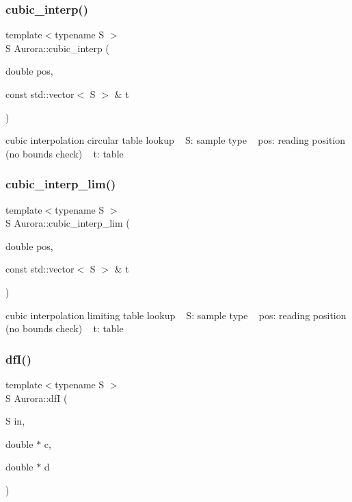 \subsubsection{\texorpdfstring{cubic\+\_\+interp()}{cubic\_interp()}}
{\footnotesize\ttfamily template$<$typename S $>$ \\
S Aurora\+::cubic\+\_\+interp (\begin{DoxyParamCaption}\item[{double}]{pos,  }\item[{const std\+::vector$<$ S $>$ \&}]{t }\end{DoxyParamCaption})\hspace{0.3cm}{\ttfamily [inline]}}

cubic interpolation circular table lookup ~\newline
S\+: sample type ~\newline
pos\+: reading position (no bounds check) ~\newline
t\+: table \mbox{\label{namespace_aurora_af2e17b2dd2a65b4a036a4106cd71ae0a}} 
\subsubsection{\texorpdfstring{cubic\+\_\+interp\+\_\+lim()}{cubic\_interp\_lim()}}
{\footnotesize\ttfamily template$<$typename S $>$ \\
S Aurora\+::cubic\+\_\+interp\+\_\+lim (\begin{DoxyParamCaption}\item[{double}]{pos,  }\item[{const std\+::vector$<$ S $>$ \&}]{t }\end{DoxyParamCaption})\hspace{0.3cm}{\ttfamily [inline]}}

cubic interpolation limiting table lookup ~\newline
S\+: sample type ~\newline
pos\+: reading position (no bounds check) ~\newline
t\+: table \mbox{\label{namespace_aurora_ac8ec71dca2761ba7e67669e84faf11dc}} 
\subsubsection{\texorpdfstring{df\+I()}{dfI()}}
{\footnotesize\ttfamily template$<$typename S $>$ \\
S Aurora\+::dfI (\begin{DoxyParamCaption}\item[{S}]{in,  }\item[{double $\ast$}]{c,  }\item[{double $\ast$}]{d }\end{DoxyParamCaption})\hspace{0.3cm}{\ttfamily [inline]}}

